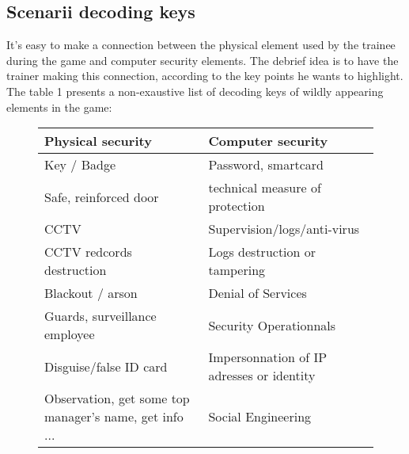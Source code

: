 \documentclass[11pt]{article} %
\begin{document}

\subsection{Scenarii decoding keys}
It's easy to make a connection between the physical element used by the trainee during 
the game and computer security elements. The debrief idea is to have the trainer making
this connection, according to the key points he wants to highlight. The table 1 presents a 
non-exaustive list of decoding keys of wildly appearing elements in the game: 

\begin{figure}
    \begin{tabularx}{\textwidth}{|X|X|}
    \hline
Physical security & Computer security \\ \hline
Key / Badge & Password, smartcard \\
Safe, reinforced door & technical measure of protection \\
CCTV & Supervision/logs/anti-virus \\
CCTV redcords destruction & Logs destruction or tampering \\
Blackout / arson & Denial of Services \\
Guards, surveillance employee & Security Operationnals \\
Disguise/false ID card & Impersonnation of IP adresses or identity \\
Observation, get some top manager's name, get info ... & Social Engineering \\

\end{tabularx}
\end{figure}
\end{document}
